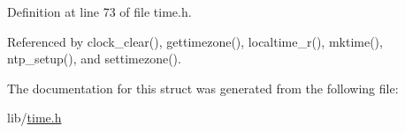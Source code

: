 Definition at line 73 of file time.\-h.



Referenced by clock\-\_\-clear(), gettimezone(), localtime\-\_\-r(), mktime(), ntp\-\_\-setup(), and settimezone().



The documentation for this struct was generated from the following file\-:\begin{DoxyCompactItemize}
\item 
lib/\hyperlink{time_8h}{time.\-h}\end{DoxyCompactItemize}
